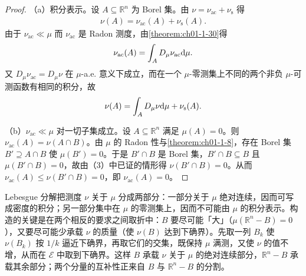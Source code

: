 \documentclass[../../main.tex]{subfiles}%
\begin{document}
\begin{proof}
（a）积分表示。设 $A\subseteq\mathbb{R}^n$ 为 Borel 集。由 $\nu=\nu_{\mathrm{ac}}+\nu_{\mathrm{s}}$ 得
\begin{align*}
\nu(A)=\nu_{\mathrm{ac}}(A)+\nu_{\mathrm{s}}(A).
\end{align*}
由于 $\nu_{\mathrm{ac}}\ll\mu$ 而 $\nu_{\mathrm{ac}}$ 是 Radon 测度，由\cref{theorem:ch01-1-30}得%
\begin{align*}
\nu_{\mathrm{ac}}(A)=\int_A D_{\mu}\nu_{\mathrm{ac}}\mathrm{d}\mu .
\end{align*}
又 $D_{\mu}\nu_{\mathrm{ac}}=D_{\mu}\nu$ 在 $\mu$-a.e. 意义下成立，而在一个 $\mu$-零测集上不同的两个非负 $\mu$-可测函数有相同的积分，故
\begin{align*}
\nu(A)=\int_A D_{\mu}\nu\mathrm{d}\mu+\nu_{\mathrm{s}}(A).
\end{align*}

（b）$\nu_{\mathrm{ac}}\ll\mu$ 对一切子集成立。设 $A\subseteq\mathbb{R}^n$ 满足 $\mu(A)=0$。则 $\nu_{\mathrm{ac}}(A)=\nu(A\cap B)$。由 $\mu$ 的 Radon 性与\cref{theorem:ch01-1-8}，存在 Borel 集 $B'\supseteq A\cap B$ 使 $\mu(B')=0$。于是 $B'\cap B$ 是 Borel 集，$B'\cap B\subseteq B$ 且 $\mu(B'\cap B)=0$，故由（3）中已证的情形得 $\nu(B'\cap B)=0$。从而 $\nu_{\mathrm{ac}}(A)\leqslant\nu(B'\cap B)=0$，即 $\nu_{\mathrm{ac}}(A)=0$。%
\end{proof}

\begin{remark}\label{remark:ch01-thm-1-31-动机}
Lebesgue 分解把测度 $\nu$ 关于 $\mu$ 分成两部分：一部分关于 $\mu$ 绝对连续，因而可写成密度的积分；另一部分集中在 $\mu$ 的零测集上，因而不可能由 $\mu$ 的积分表示。构造的关键是在两个相反的要求之间取折中：$B$ 要尽可能「大」（$\mu(\mathbb{R}^n-B)=0$），又要尽可能少承载 $\nu$ 的质量（使 $\nu(B)$ 达到下确界）。先取一列 $B_k$ 使 $\nu(B_k)$ 按 $1/k$ 逼近下确界，再取它们的交集，既保持 $\mu$ 满测，又使 $\nu$ 的值不增，从而在 $\mathcal{E}$ 中取到下确界。这样 $B$ 承载 $\nu$ 关于 $\mu$ 的绝对连续部分，$\mathbb{R}^n-B$ 承载其余部分；两个分量的互补性正来自 $B$ 与 $\mathbb{R}^n-B$ 的分割。
\end{remark}
\end{document}
